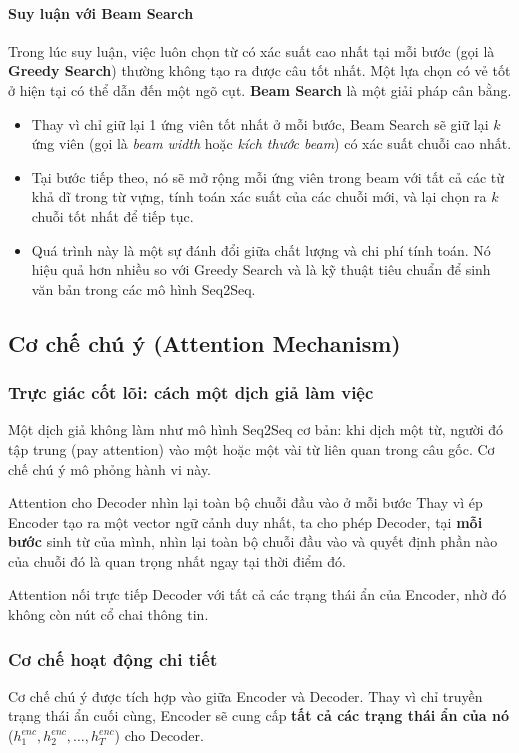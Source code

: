 \paragraph{Suy luận với Beam Search}
Trong lúc suy luận, việc luôn chọn từ có xác suất cao nhất tại mỗi bước (gọi là \textbf{Greedy Search}) thường không tạo ra được câu tốt nhất. Một lựa chọn có vẻ tốt ở hiện tại có thể dẫn đến một ngõ cụt. \textbf{Beam Search} là một giải pháp cân bằng.
\begin{itemize}
    \item Thay vì chỉ giữ lại 1 ứng viên tốt nhất ở mỗi bước, Beam Search sẽ giữ lại $k$ ứng viên (gọi là \textit{beam width} hoặc \textit{kích thước beam}) có xác suất chuỗi cao nhất.
    \item Tại bước tiếp theo, nó sẽ mở rộng mỗi ứng viên trong beam với tất cả các từ khả dĩ trong từ vựng, tính toán xác suất của các chuỗi mới, và lại chọn ra $k$ chuỗi tốt nhất để tiếp tục.
    \item Quá trình này là một sự đánh đổi giữa chất lượng và chi phí tính toán. Nó hiệu quả hơn nhiều so với Greedy Search và là kỹ thuật tiêu chuẩn để sinh văn bản trong các mô hình Seq2Seq.
\end{itemize}
\subsection{Cơ chế chú ý (Attention Mechanism)}
\label{ssec:attention}

\subsubsection{Trực giác cốt lõi: cách một dịch giả làm việc}
Một dịch giả không làm như mô hình Seq2Seq cơ bản: khi dịch một từ, người đó tập trung (pay attention) vào một hoặc một vài từ liên quan trong câu gốc. Cơ chế chú ý mô phỏng hành vi này.

\begin{keyidea}{Attention cho Decoder nhìn lại toàn bộ chuỗi đầu vào ở mỗi bước}
Thay vì ép Encoder tạo ra một vector ngữ cảnh duy nhất, ta cho phép Decoder, tại \textbf{mỗi bước} sinh từ của mình, nhìn lại toàn bộ chuỗi đầu vào và quyết định phần nào của chuỗi đó là quan trọng nhất ngay tại thời điểm đó.
\end{keyidea}

Attention nối trực tiếp Decoder với tất cả các trạng thái ẩn của Encoder, nhờ đó không còn nút cổ chai thông tin.

\subsubsection{Cơ chế hoạt động chi tiết}
Cơ chế chú ý được tích hợp vào giữa Encoder và Decoder. Thay vì chỉ truyền trạng thái ẩn cuối cùng, Encoder sẽ cung cấp \textbf{tất cả các trạng thái ẩn của nó} ($h_1^{enc}, h_2^{enc}, \dots, h_T^{enc}$) cho Decoder.

